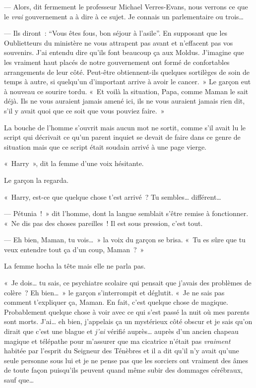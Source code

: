 --- Alors, dit fermement le professeur Michael Verres-Evans, nous verrons ce que le \emph{vrai} gouvernement a à dire à ce sujet. Je connais un parlementaire ou trois…

--- Ils diront~: “Vous êtes fous, bon séjour à l'asile”. En supposant que les Oublietteurs du ministère ne vous attrapent pas avant et n'effacent pas vos souvenirs. J'ai entendu dire qu'ils font beaucoup ça aux Moldus. J'imagine que les vraiment haut placés de notre gouvernement ont formé de confortables arrangements de leur côté. Peut-être obtiennent-ils quelques sortilèges de soin de temps à autre, si quelqu'un d'important arrive à avoir le cancer.~» Le garçon eut à nouveau ce sourire tordu. «~Et voilà la situation, Papa, comme Maman le sait déjà. Ils ne vous auraient jamais amené ici, ils ne vous auraient jamais rien dit, s'il y avait quoi que ce soit que vous pouviez faire.~»

La bouche de l'homme s'ouvrit mais aucun mot ne sortit, comme s'il avait lu le script qui décrivait ce qu'un parent inquiet se devait de faire dans ce genre de situation mais que ce script était soudain arrivé à une page vierge.

«~Harry~», dit la femme d'une voix hésitante.

Le garçon la regarda.

«~Harry, est-ce que quelque chose t'est arrivé~? Tu sembles… différent…

--- Pétunia~!~» dit l'homme, dont la langue semblait s'être remise à fonctionner. «~Ne dis pas des choses pareilles~! Il est sous pression, c'est tout.

--- Eh bien, Maman, tu vois…~» la voix du garçon se brisa. «~Tu es sûre que tu veux entendre tout ça d'un coup, Maman~?~»

La femme hocha la tête mais elle ne parla pas.

«~Je dois… tu sais, ce psychiatre scolaire qui pensait que j'avais des problèmes de colère~? Eh bien…~» le garçon s'interrompit et déglutit. «~Je ne sais pas comment t'expliquer ça, Maman. En fait, c'est quelque chose de magique. Probablement quelque chose à voir avec ce qui s'est passé la nuit où mes parents sont morts. J'ai… eh bien, j'appelais ça un mystérieux côté obscur et je sais qu'on dirait que c'est une blague et \emph{j'ai} vérifié auprès… auprès d'un ancien chapeau magique et télépathe pour m'assurer que ma cicatrice n'était pas \emph{vraiment} habitée par l'esprit du Seigneur des Ténèbres et il a dit qu'il n'y avait qu'une seule personne sous lui et je ne pense pas que les sorciers ont vraiment des âmes de toute façon puisqu'ils peuvent quand même subir des dommages cérébraux, sauf que…

